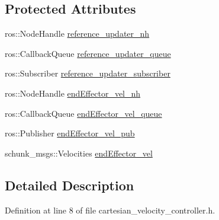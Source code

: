 \subsection*{Protected Attributes}
\begin{DoxyCompactItemize}
\item 
ros\-::\-Node\-Handle \hyperlink{classCartesian__velocity__controller_a7d04d378a2a6d19870a620883dcd3e09}{reference\-\_\-updater\-\_\-nh}
\item 
ros\-::\-Callback\-Queue \hyperlink{classCartesian__velocity__controller_ad2804cf83a42305d18572abdbbfd1c3f}{reference\-\_\-updater\-\_\-queue}
\item 
ros\-::\-Subscriber \hyperlink{classCartesian__velocity__controller_a75412b9859afe4b800f9613c9cb8d17f}{reference\-\_\-updater\-\_\-subscriber}
\item 
ros\-::\-Node\-Handle \hyperlink{classCartesian__velocity__controller_a01cbe7f951c69ded8604e552a0a706e0}{end\-Effector\-\_\-vel\-\_\-nh}
\item 
ros\-::\-Callback\-Queue \hyperlink{classCartesian__velocity__controller_af154b0cda931081b52224eb22e4680f7}{end\-Effector\-\_\-vel\-\_\-queue}
\item 
ros\-::\-Publisher \hyperlink{classCartesian__velocity__controller_ab12287816ae785d3cd6243b3df0cffc6}{end\-Effector\-\_\-vel\-\_\-pub}
\item 
schunk\-\_\-msgs\-::\-Velocities \hyperlink{classCartesian__velocity__controller_ae771d963a90ad7b844c4c3a821ce5f39}{end\-Effector\-\_\-vel}
\end{DoxyCompactItemize}


\subsection{Detailed Description}


Definition at line 8 of file cartesian\-\_\-velocity\-\_\-controller.\-h.



